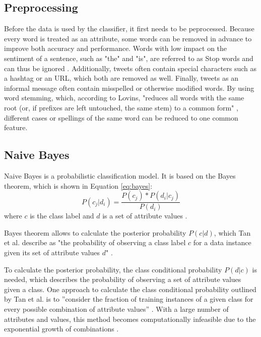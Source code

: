 \subsection{Preprocessing}
Before the data is used by the classifier, it first needs to be peprocessed. Because every word is treated as an attribute, some words can be removed in advance to improve both accuracy and performance. Words with low impact on the sentiment of a sentence, such as "the" and
"is", are referred to as Stop words and can thus be ignored \cite{DBLP:journals/csur/GiachanouC16}. Additionally, tweets often contain special characters such as a hashtag or an URL, which both are removed as well. Finally, tweets as an informal message often contain misspelled or otherwise modified words. By using word stemming, which, according to Lovins, "reduces all words with the same root (or, if prefixes are left
untouched, the same stem) to a common form" \cite[p.~22]{Lovins1968DevelopmentOA}, different cases or spellings of the same word can be reduced to one common feature.
    \subsection{Naive Bayes}
        Naive Bayes is a probabilistic classification model. It is based on the Bayes theorem, which is shown in Equation \eqref{eq:bayes}:
        \begin{equation}
            \label{eq:bayes}
            P(c_j|d_i) = \frac{P(c_j) * P(d_i|c_j)}{P(d_i)}
        \end{equation}
        where $c$ is the class label and $d$ is a set of attribute values \cite{DBLP:books/aw/TanSKK2019}. 
        

        Bayes theorem allows to calculate the posterior probability $P(c|d)$, which Tan et al. describe as "the probability of observing a class label $c$ for a data instance given its set of attribute values $d$" \cite[p.~418]{DBLP:books/aw/TanSKK2019}. 

        To calculate the posterior probability, the class conditional probability $P(d|c)$ is needed, which describes the probability of observing a set of attribute values given a class. One approach to calculate the class conditional probability outlined by Tan et al. is to ''consider the fraction of training instances of a given class for every possible combination of attribute values'' \cite[p.~419]{DBLP:books/aw/TanSKK2019}. With a large number of attributes and values, this method becomes computationally infeasible due to the exponential growth of combinations \cite{DBLP:books/aw/TanSKK2019}.

